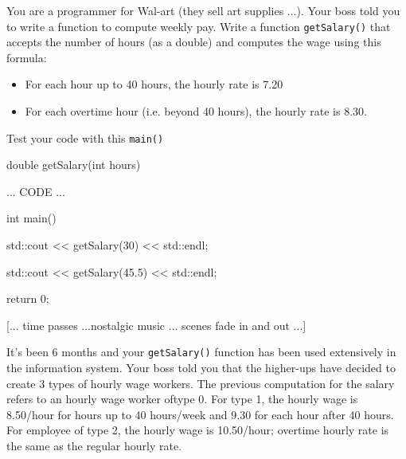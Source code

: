You are a programmer for Wal-art (they sell art supplies ...). Your boss told you to write a function to compute weekly pay. Write a function \texttt{getSalary()} that accepts the number of hours (as a double) and computes the wage using this formula:



\begin{itemize}

\item For each hour up to 40 hours, the hourly rate is 7.20

\item For each overtime hour (i.e. beyond 40 hours), the hourly rate is 8.30.

\end{itemize}



Test your code with this \texttt{main()}



\begin{consolethree}[escapeinside=||]

double getSalary(int hours)

{

    ... CODE ...

}



int main()

{

    std::cout << getSalary(30) << std::endl;

    std::cout << getSalary(45.5) << std::endl;

    return 0;

}

\end{consolethree}



[... time passes ...nostalgic music ... scenes fade in and out ...]



It's been 6 months and your \texttt{getSalary()} function has been used extensively in the information system. Your boss told you that the higher-ups have decided to create 3 types of hourly wage workers. The previous computation for the salary refers to an hourly wage worker oftype 0. For type 1, the hourly wage is 8.50/hour for hours up to 40 hours/week and 9.30 for each hour after 40 hours. For employee of type 2, the hourly wage is 10.50/hour; overtime hourly rate is the same as the regular hourly rate.



